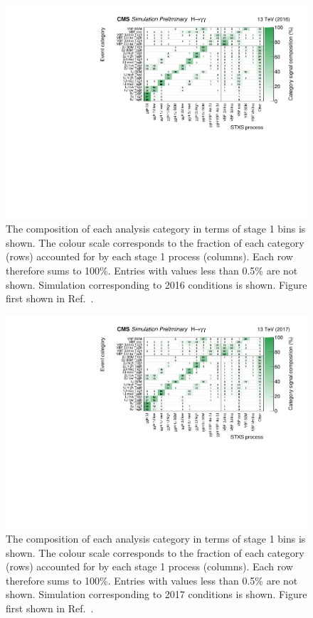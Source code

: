 \begin{figure}[hptb]
  \centering
  \includegraphics[width=\textwidth]{Figures/Results/Cats2016.pdf}
  \caption[Signal composition of 2016 analysis categories.]
  {
    The composition of each analysis category in terms of stage 1 bins is shown. 
    The colour scale corresponds to the fraction of each category (rows) 
    accounted for by each stage 1 process (columns). 
    Each row therefore sums to 100\%. 
    Entries with values less than 0.5\% are not shown. 
    Simulation corresponding to 2016 conditions is shown.
    Figure first shown in Ref.~\cite{HIG-18-029}.
  }
  \label{fig:results_Cats2016}
\end{figure}

\begin{figure}[hptb]
  \centering
  \includegraphics[width=\textwidth]{Figures/Results/Cats2017.pdf}
  \caption[Signal composition of 2017 analysis categories.]
  {
    The composition of each analysis category in terms of stage 1 bins is shown. 
    The colour scale corresponds to the fraction of each category (rows) 
    accounted for by each stage 1 process (columns). 
    Each row therefore sums to 100\%. 
    Entries with values less than 0.5\% are not shown. 
    Simulation corresponding to 2017 conditions is shown.
    Figure first shown in Ref.~\cite{HIG-18-029}.
  }
  \label{fig:results_Cats2017}
\end{figure}

